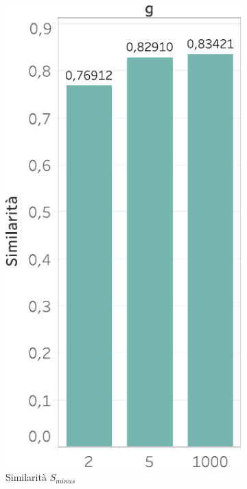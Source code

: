 \begin{figure}
  \centering
   \begin{subfigure}{.5\textwidth}
  \centering
      \includegraphics[scale=0.6]{res/fig/sec-4/scalability/ComparisonGSimilarity.pdf}
  \caption{Similarità \(S_{minus}\)}%
\end{subfigure}%
\begin{subfigure}{.5\textwidth}
  \centering

\end{subfigure}
\end{figure}
